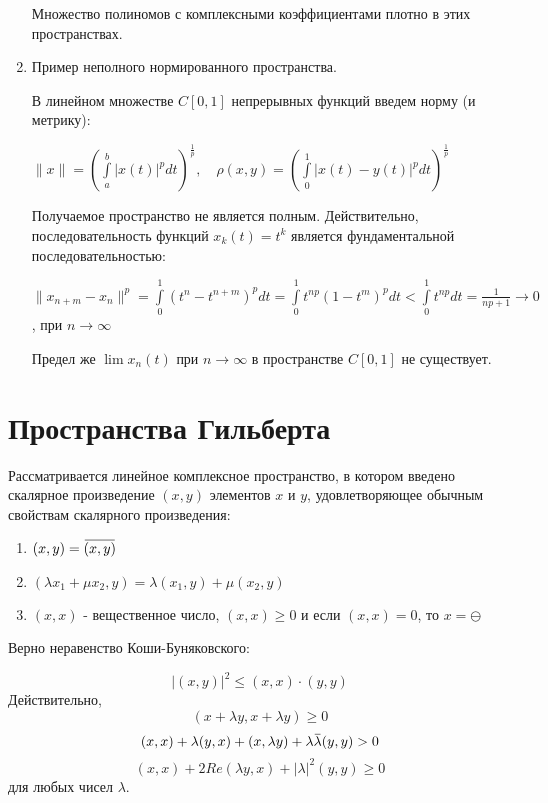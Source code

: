 \documentclass[12pt,a4paper,titlepage]{book}
\newcommand{\overbar}[1]{\mkern 1.5mu\overline{\mkern-1.5mu#1\mkern-1.5mu}\mkern 1.5mu}
\theoremstyle{definition}
\theoremstyle{plain}
\theoremstyle{remark}
\theoremstyle{remark}
\theoremstyle{remark}
\theoremstyle{plain}
\begin{document}
\begin{enumerate}
	Множество полиномов с комплексными коэффициентами плотно в этих пространствах.

	\item Пример неполного нормированного пространства.

	В линейном множестве $C[0,1]$ непрерывных функций введем норму (и метрику):

	\begin{center}
	$\lVert x\rVert = (\int\limits_a^b\lvert x(t)\rvert^pdt)^{\frac{1}{p}},\quad\rho(x,y) = (\int\limits_0^1\lvert x(t)-y(t)\rvert^pdt)^{\frac{1}{p}}$
	\end{center}

	Получаемое пространство не является полным. Действительно, последовательность функций $x_k(t)=t^k$ является фундаментальной последовательностью:

	\begin{center}
	$\lVert x_{n+m}-x_n\rVert^p=\int\limits_0^1(t^n-t^{n+m})^pdt=\int\limits_0^1t^{np}(1-t^m)^pdt<\int\limits_0^1t^{np}dt=\frac{1}{np+1}\to0$, при $n\to\infty$
	\end{center}

	Предел же $\lim x_n(t)$ при $n\to\infty$ в пространстве $C[0,1]$ не существует.

\end{enumerate}

\section{Пространства Гильберта}

Рассматривается линейное комплексное пространство, в котором введено скалярное произведение $(x, y)$ элементов $x$ и $y$, удовлетворяющее обычным свойствам скалярного произведения:

\begin{enumerate}

    \item $(x, y) = \overbar{(x, y)}$

    \item $(\lambda x_1 + \mu x_2, y) = \lambda (x_1, y) + \mu (x_2, y)$

    \item $(x, x)$ - вещественное число, $(x, x) \geqslant 0$ и если $(x, x) = 0$, то $x = \ominus$

\end{enumerate}

Верно неравенство Коши-Буняковского:

$$|(x, y)|^2 \le (x, x) \cdot (y, y)$$
Действительно, 
$$(x + \lambda y, x + \lambda y) \ge 0$$
$$(x, x) + \lambda (y, x) + (x, \lambda y) + \lambda \overbar{\lambda} (y, y) > 0$$
$$(x,x) + 2 Re(\lambda y, x) + |\lambda|^2 (y, y) \ge 0$$
для любых чисел $\lambda$.
\end{document}
